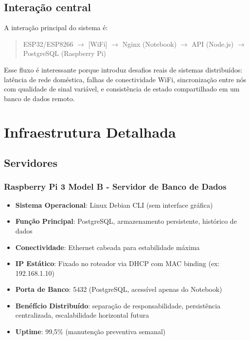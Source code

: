 \documentclass[12pt,a4paper,oneside]{report}
\begin{document}
\section{Interação central}
A interação principal do sistema é:
\begin{quote}
ESP32/ESP8266 $\rightarrow$ [WiFi] $\rightarrow$ Nginx (Notebook) $\rightarrow$ API (Node.js) $\rightarrow$ PostgreSQL (Raspberry Pi)
\end{quote}

Esse fluxo é interessante porque introduz desafios reais de sistemas distribuídos: latência de rede doméstica, falhas de conectividade WiFi, sincronização entre nós com qualidade de sinal variável, e consistência de estado compartilhado em um banco de dados remoto.

\chapter{Infraestrutura Detalhada}

\section{Servidores}

\subsection{Raspberry Pi 3 Model B - Servidor de Banco de Dados}
\begin{itemize}[leftmargin=1.2cm]
    \item \textbf{Sistema Operacional}: Linux Debian CLI (sem interface gráfica)
    \item \textbf{Função Principal}: PostgreSQL, armazenamento persistente, histórico de dados
    \item \textbf{Conectividade}: Ethernet cabeada para estabilidade máxima
    \item \textbf{IP Estático}: Fixado no roteador via DHCP com MAC binding (ex: 192.168.1.10)
    \item \textbf{Porta de Banco}: 5432 (PostgreSQL, acessível apenas do Notebook)
    \item \textbf{Benéfício Distribuído}: separação de responsabilidade, persistência centralizada, escalabilidade horizontal futura
    \item \textbf{Uptime}: 99,5\% (manutenção preventiva semanal)
\end{itemize}
\end{document}

